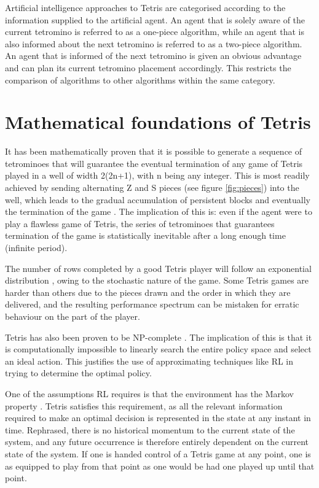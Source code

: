\documentclass{rucsthesis}
\begin{document}
Artificial intelligence approaches to Tetris are categorised according to the information supplied to the artificial agent. An agent that is solely aware of the current tetromino is referred to as a one-piece algorithm, while an agent that is also informed about the next tetromino is referred to as a two-piece algorithm. An agent that is informed of the next tetromino is given an obvious advantage and can plan its current tetromino placement accordingly. This restricts the comparison of algorithms to other algorithms within the same category.

\section{Mathematical foundations of Tetris}

It has been mathematically proven \citep{mathproof,losetetris} that it is possible to generate a sequence of tetrominoes that will guarantee the eventual termination of any game of Tetris played in a well of width 2(2n+1), with n being any integer. This is most readily achieved by sending alternating Z and S pieces (see figure \ref{fig:pieces}) into the well, which leads to the gradual accumulation of persistent blocks and eventually the termination of the game \citep[Chpt. 5]{mathproof}. The implication of this is: even if the agent were to play a flawless game of Tetris, the series of tetrominoes that guarantees termination of the game is statistically inevitable after a long enough time (infinite period). 

The number of rows completed by a good Tetris player will follow an exponential distribution \citep{tetstand}, owing to the stochastic nature of the game. Some Tetris games are harder than others due to the pieces drawn and the order in which they are delivered, and the resulting performance spectrum can be mistaken for erratic behaviour on the part of the player.

Tetris has also been proven to be NP-complete \citep{hardtet}. The implication of this is that it is computationally impossible to linearly search the entire policy space and select an ideal action. This justifies the use of approximating techniques like RL in trying to determine the optimal policy.

One of the assumptions RL requires is that the environment has the Markov property \citep{suttonbarto}. Tetris satisfies this requirement, as all the relevant information required to make an optimal decision is represented in the state at any instant in time. Rephrased, there is no historical momentum to the current state of the system, and any future occurrence is therefore entirely dependent on the current state of the system. If one is handed control of a Tetris game at any point, one is as equipped to play from that point as one would be had one played up until that point.
\end{document}
